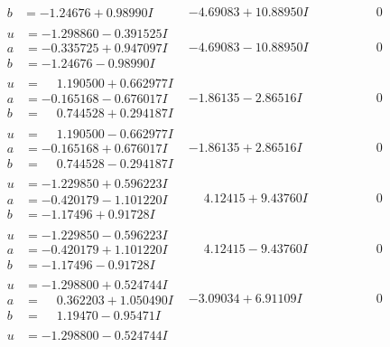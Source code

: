 \documentclass[1p]{elsarticle_modified}
\theoremstyle{definition}
\begin{document}
$$\begin{array}{c|c|c}
\begin{aligned}
b &= -1.24676 + 0.98990 I\end{aligned}
 & -4.69083 + 10.88950 I & \phantom{-0.000000 } 0 \\ \hline\begin{aligned}
u &= -1.298860 - 0.391525 I \\
a &= -0.335725 + 0.947097 I \\
b &= -1.24676 - 0.98990 I\end{aligned}
 & -4.69083 - 10.88950 I & \phantom{-0.000000 } 0 \\ \hline\begin{aligned}
u &= \phantom{-}1.190500 + 0.662977 I \\
a &= -0.165168 - 0.676017 I \\
b &= \phantom{-}0.744528 + 0.294187 I\end{aligned}
 & -1.86135 - 2.86516 I & \phantom{-0.000000 } 0 \\ \hline\begin{aligned}
u &= \phantom{-}1.190500 - 0.662977 I \\
a &= -0.165168 + 0.676017 I \\
b &= \phantom{-}0.744528 - 0.294187 I\end{aligned}
 & -1.86135 + 2.86516 I & \phantom{-0.000000 } 0 \\ \hline\begin{aligned}
u &= -1.229850 + 0.596223 I \\
a &= -0.420179 - 1.101220 I \\
b &= -1.17496 + 0.91728 I\end{aligned}
 & \phantom{-}4.12415 + 9.43760 I & \phantom{-0.000000 } 0 \\ \hline\begin{aligned}
u &= -1.229850 - 0.596223 I \\
a &= -0.420179 + 1.101220 I \\
b &= -1.17496 - 0.91728 I\end{aligned}
 & \phantom{-}4.12415 - 9.43760 I & \phantom{-0.000000 } 0 \\ \hline\begin{aligned}
u &= -1.298800 + 0.524744 I \\
a &= \phantom{-}0.362203 + 1.050490 I \\
b &= \phantom{-}1.19470 - 0.95471 I\end{aligned}
 & -3.09034 + 6.91109 I & \phantom{-0.000000 } 0 \\ \hline\begin{aligned}
u &= -1.298800 - 0.524744 I \\

\end{aligned}
\end{array}$$
\end{document}
